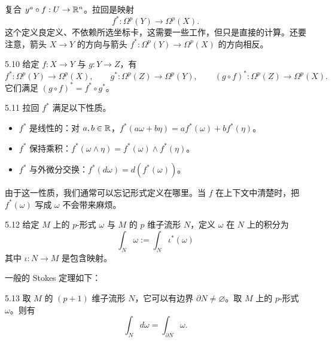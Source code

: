 复合 $y^a\circ f:U\to\mathbb{R}^n$。拉回是映射
\begin{equation}
  f^*:\Omega^p(Y)\to\Omega^p(X).
  \tag{5.31}
\end{equation}
这个定义良定义、不依赖所选坐标卡，这需要一些工作，但只是直接的计算。还要注意，箭头 $X\to Y$ 的方向与箭头 $f^*:\Omega^p(Y)\to\Omega^p(X)$ 的方向相反。

\begin{proposition}{5.10}
  给定 $f:X\to Y$ 与 $g:Y\to Z$，有
  \begin{equation}
    f^*:\Omega^p(Y)\to\Omega^p(X),\qquad
    g^*:\Omega^p(Z)\to\Omega^p(Y),\qquad
    (g\circ f)^*:\Omega^p(Z)\to\Omega^p(X).
    \tag{5.32}
  \end{equation}
  它们满足 $(g\circ f)^*=f^*\circ g^*$。
\end{proposition}

\begin{proposition}{5.11}
  拉回 $f^*$ 满足以下性质。
  \begin{itemize}
    \item $f^*$ 是线性的：对 $a,b\in\mathbb{R}$，$f^*(a\omega+b\eta)=af^*(\omega)+bf^*(\eta)$。
    \item $f^*$ 保持乘积：$f^*(\omega\wedge\eta)=f^*(\omega)\wedge f^*(\eta)$。
    \item $f^*$ 与外微分交换：$f^*(d\omega)=d(f^*(\omega))$。
  \end{itemize}
\end{proposition}

由于这一性质，我们通常可以忘记形式定义在哪里。当 $f$ 在上下文中清楚时，把 $f^*(\omega)$ 写成 $\omega$ 不会带来麻烦。

\begin{definition}{5.12}
  给定 $M$ 上的 $p$-形式 $\omega$ 与 $M$ 的 $p$ 维子流形 $N$，定义 $\omega$ 在 $N$ 上的积分为
  \begin{equation}
    \int_N\omega:=\int_N\iota^*(\omega)
    \tag{5.33}
  \end{equation}
  其中 $\iota:N\to M$ 是包含映射。
\end{definition}

一般的 Stokes 定理如下：

\begin{proposition}{5.13}
  取 $M$ 的 $(p+1)$ 维子流形 $N$，它可以有边界 $\partial N\ne\varnothing$。取 $M$ 上的 $p$-形式 $\omega$。则有
  \begin{equation}
    \int_N d\omega=\int_{\partial N}\omega.
    \tag{5.34}
  \end{equation}
\end{proposition}

